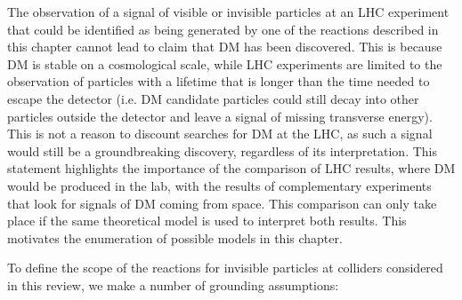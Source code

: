 The observation of a signal of visible or invisible particles at an LHC experiment that could be identified as being generated by one of the reactions described in this chapter cannot lead to claim that DM has been discovered. This is because DM is stable on a cosmological scale, while LHC experiments are limited to the observation of particles with a lifetime that is longer than the time needed to escape the detector (i.e. DM candidate particles could still decay into other particles outside the detector and leave a signal of missing transverse energy). This is not a reason to discount searches for DM at the LHC, as such a signal would still be a groundbreaking discovery, regardless of its interpretation. This statement highlights the importance of the comparison of LHC results, where DM would be produced in the lab, with the results of complementary experiments that look for signals of DM coming from space. This comparison can only take place if the same theoretical model is used to interpret both results. This motivates the enumeration of possible models in this chapter. 

To define the scope of the reactions for invisible particles at colliders considered in this review, we make a number of grounding assumptions: 

